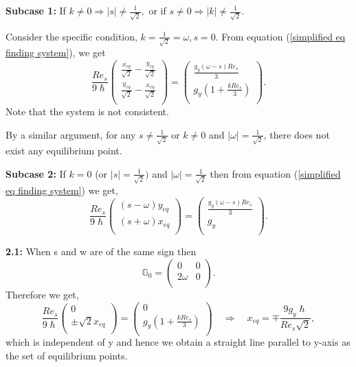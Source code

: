 \documentclass[pdflatex,sn-mathphys]{sn-jnl}%
\theoremstyle{thmstyleone}%
\theoremstyle{thmstyletwo}%
\theoremstyle{thmstylethree}%
\begin{document}
\textbf{Subcase 1:} If $k \neq 0 \Rightarrow |s| \neq \frac{1}{\sqrt{2}},$ or if $s \neq 0  \Rightarrow |k| \neq \frac{1}{\sqrt{2}}.$ 

Consider the specific condition, $k=\frac{1}{\sqrt{2}}=\omega, s=0.$ From equation (\ref{simplified eq finding system}), we get $$  \frac{Re_{s}}{9\hslash}\left(
\begin{array}{cc}
\frac{x_{eq} }{\sqrt{2}} -\frac{y_{eq}}{\sqrt{2}} \\
 \frac{y_{eq} }{\sqrt{2}} -\frac{x_{eq}}{\sqrt{2}} \\
\end{array}
\right)=
\left(
\begin{array}{cc}
 \frac{g_{y}(\omega-s)Re_{s}}{3}  \\
g_{y} (1+\frac{kRe_{s}}{3} )\\
\end{array}
\right) .$$ 
Note that the system is not consistent. 

By a similar argument, for any $s \neq \frac{1}{\sqrt{2}}$ or $k\neq0$ and $\vert\omega\vert=\frac{1}{\sqrt{2}}$, there does not exist any equilibrium point.


\textbf{Subcase 2: } If $k=0$ (or $|s|=\frac{1}{\sqrt{2}})$ and $\vert\omega\vert=\frac{1}{\sqrt{2}}$ then from  equation (\ref{simplified eq finding system}) we get, 
$$  \frac{Re_{s}}{9\hslash}\left(
\begin{array}{cc}
(s-\omega)y_{eq} \\
(s+\omega)x_{eq}\\
\end{array}
\right)=
\left(
\begin{array}{cc}
 \frac{g_{y}(\omega-s)Re_{s}}{3}  \\
g_{y}\\
\end{array}
\right). $$

\textbf{2.1:} When s and w are of the same sign then 
$$\mathbb{G}_{0}=\left(
\begin{array}{cc}
 0 & 0 \\
2\omega & 0 \\
\end{array}
\right).$$
  Therefore we get, 
  \begin{equation}
    \frac{Re_{s}}{9\hslash}\left(
\begin{array}{cc}
0 \\
\pm \sqrt{2}x_{eq} \\
\end{array}
\right)=
\left(
\begin{array}{cc}
0  \\
g_{y} (1+\frac{kRe_{s}}{3} )\\
\end{array}
\right) \quad \Rightarrow \quad x_{eq} = \mp \frac{9 g_{y} \hslash}{Re_{s} \sqrt{2}},\label{line eq points}
\end{equation}
which is independent of y and hence we obtain a straight line parallel to y-axis as the set of equilibrium points.
\end{document}
